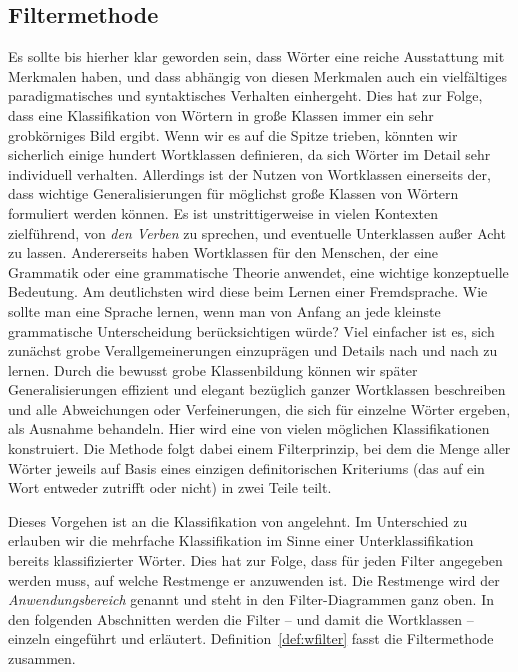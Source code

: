 \label{sec:wortklassendesdeutschen}

\subsection{Filtermethode}

\label{sec:filtermethode}

Es sollte bis hierher klar geworden sein, dass Wörter eine reiche Ausstattung mit Merkmalen haben, und dass abhängig von diesen Merkmalen auch ein vielfältiges paradigmatisches und syntaktisches Verhalten einhergeht.
Dies hat zur Folge, dass eine Klassifikation von Wörtern in große Klassen immer ein sehr grobkörniges Bild ergibt.
Wenn wir es auf die Spitze trieben, könnten wir sicherlich einige hundert Wortklassen definieren, da sich Wörter im Detail sehr individuell verhalten.
Allerdings ist der Nutzen von Wortklassen einerseits der, dass wichtige Generalisierungen für möglichst große Klassen von Wörtern formuliert werden können.
Es ist unstrittigerweise in vielen Kontexten zielführend, von \textit{den Verben} zu sprechen, und eventuelle Unterklassen außer Acht zu lassen.
Andererseits haben Wortklassen für den Menschen, der eine Grammatik oder eine grammatische Theorie anwendet, eine wichtige konzeptuelle Bedeutung.
Am deutlichsten wird diese beim Lernen einer Fremdsprache.
Wie sollte man eine Sprache lernen, wenn man von Anfang an jede kleinste grammatische Unterscheidung berücksichtigen würde?
Viel einfacher ist es, sich zunächst grobe Verallgemeinerungen einzuprägen und Details nach und nach zu lernen.
Durch die bewusst grobe Klassenbildung können wir später Generalisierungen effizient und elegant bezüglich ganzer Wortklassen beschreiben und alle Abweichungen oder Verfeinerungen, die sich für einzelne Wörter ergeben, als Ausnahme behandeln.
Hier wird eine von vielen möglichen Klassifikationen konstruiert.
Die Methode folgt dabei einem Filterprinzip, bei dem die Menge aller Wörter jeweils auf Basis eines einzigen definitorischen Kriteriums (das auf ein Wort entweder zutrifft oder nicht) in zwei Teile teilt.

Dieses Vorgehen ist an die Klassifikation von \citet{Engel09} angelehnt.
Im Unterschied zu \citet{Engel09} erlauben wir die mehrfache Klassifikation im Sinne einer Unterklassifikation bereits klassifizierter Wörter.
Dies hat zur Folge, dass für jeden Filter angegeben werden muss, auf welche Restmenge er anzuwenden ist.
Die Restmenge wird der \textit{Anwendungsbereich} genannt und steht in den Filter-Diagrammen ganz oben.
In den folgenden Abschnitten werden die Filter -- und damit die Wortklassen -- einzeln eingeführt und erläutert.
Definition~\ref{def:wfilter} fasst die Filtermethode zusammen.

